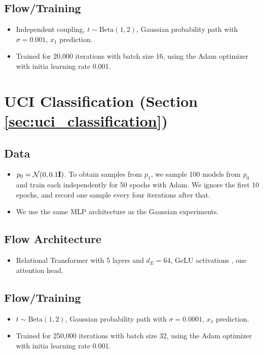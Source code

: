 \subsection*{Flow/Training}
\begin{itemize}
    \item Independent coupling, $t \sim \text{Beta}(1, 2)$, Gaussian probability path with $\sigma = 0.001$, $x_1$ prediction.
    \item Trained for 20,000 iterations with batch size 16, using the Adam optimizer with initia learning rate 0.001.
\end{itemize}

\section*{UCI Classification (Section \ref{sec:uci_classification})}

\subsection*{Data}

\begin{itemize}
    \item $p_0 = \mathcal{N}(0, 0.1 \mathbf{I})$. To obtain samples from $p_1$, we sample 100 models from $p_0$ and train each independently for 50 epochs with Adam. We ignore the first 10 epochs, and record one sample every four iterations after that. 
    \item We use the same MLP architecture as the Gaussian experiments. 
\end{itemize}

\subsection*{Flow Architecture}
\begin{itemize}
    \item Relational Transformer \citep{diaoRelationalAttentionGeneralizing2023,kofinasGraphNeuralNetworks2024} with 5 layers and $d_E = 64$, GeLU activations \citep{hendrycksGaussianErrorLinear2023a}, one attention head. 
\end{itemize}

\subsection*{Flow/Training}
\begin{itemize}
    \item $t \sim \text{Beta}(1, 2)$, Gaussian probability path with $\sigma = 0.0001$, $x_1$ prediction.
    \item Trained for 250,000 iterations with batch size 32, using the Adam optimizer with initia learning rate 0.001.
\end{itemize}


